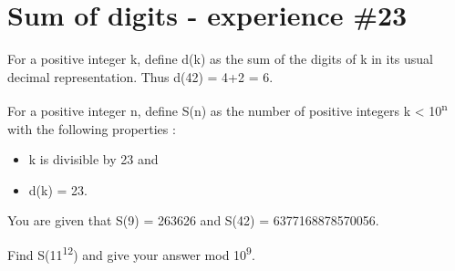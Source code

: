 \section[Problem \#294: Sum of digits - experience \#23]{Sum of digits - experience \#23}
\label{sec:problem_294}

For a positive integer k, define d(k) as the sum of the digits of k in
its usual decimal representation. Thus d(42) = 4+2 = 6.

For a positive integer n, define S(n) as the number of positive integers
k \textless{} 10\textsuperscript{n} with the following properties :

\begin{itemize}
\tightlist
\item
  k is divisible by 23 and
\item
  d(k) = 23.
\end{itemize}

You are given that S(9) = 263626 and S(42) = 6377168878570056.

Find S(11\textsuperscript{12}) and give your answer mod
10\textsuperscript{9}.
